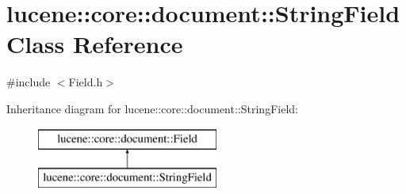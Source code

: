 \hypertarget{classlucene_1_1core_1_1document_1_1StringField}{}\section{lucene\+:\+:core\+:\+:document\+:\+:String\+Field Class Reference}
\label{classlucene_1_1core_1_1document_1_1StringField}


{\ttfamily \#include $<$Field.\+h$>$}

Inheritance diagram for lucene\+:\+:core\+:\+:document\+:\+:String\+Field\+:\begin{figure}[H]
\begin{center}
\leavevmode
\includegraphics[height=2.000000cm]{classlucene_1_1core_1_1document_1_1StringField}
\end{center}
\end{figure}
